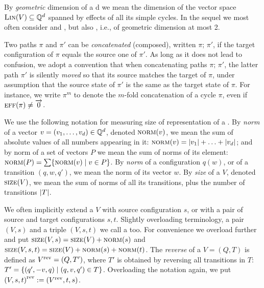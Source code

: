 By  \emph{geometric} dimension of a \parvass d we mean the dimension of the vector
space $\textsc{Lin}(V) \subseteq \mathbb{Q}^d$ spanned by effects of all its simple cycles.
%
In the sequel we most often consider \dvass and \tvass, but also \emph{\geomvass}, i.e.,
\tvass of geometric dimension at most 2.

Two paths $\pi$ and $\pi'$ can be \emph{concatenated} (composed), written $\pi; \, \pi'$, if
the target configuration of $\pi$ equals the source one of $\pi'$.
As long as it does not lead to confusion, 
we adopt a convention that when concatenating paths $\pi;\,\pi'$, 
the latter path $\pi'$ is silently \emph{moved}
so that its source matches the target of $\pi$, 
under assumption that the source state of $\pi'$ is the same as the target state of $\pi$.
For instance, we write $\pi^m$ to denote the $m$-fold concatenation of a cycle $\pi$, even if $\textsc{eff}(\pi)\neq\overrightarrow{0}$.
%

We use the following notation for measuring size of representation of a \vass.
By \emph{norm} of a vector $v=(v_1, \ldots, v_d) \in \mathbb{Q}^d$, denoted $\textsc{norm}(v)$, 
we mean the sum of absolute values of all numbers appearing in it:
$\textsc{norm}(v) = |v_1| + \ldots + |v_d|$; and 
by norm of a set of vectors $P$ we mean the sum of norms of its element:
$\textsc{norm}(P) = \sum\{\textsc{norm}(v) \mid v\in P\}$. 
By \emph{norm} of a configuration $q(w)$, or of a transition $(q, w, q')$,
we mean the norm of its vector $w$.
By \emph{size} of a \vass $V$, denoted $\textsc{size}(V)$, we mean
the sum of norms of all its transitions, 
plus the number of transitions $\left|T\right|$.

We often implicitly extend a \vass $V$ with source configuration $s$, or with
a pair of source and target configurations $s, t$.
Slightly overloading terminology, a pair $(V, s)$ and a triple $(V, s, t)$ we call a \vass too.
For convenience we overload further and put $\textsc{size}(V,s) = \textsc{size}(V) + \textsc{norm}(s)$ and 
$\textsc{size}(V, s, t) = \textsc{size}(V) + \textsc{norm}(s) + \textsc{norm}(t)$.
The \emph{reverse} of a \vass $V = (Q, T)$ is defined as ${V}^{\text{rev}} = (Q, T')$,
where $T'$ is obtained by reversing all transitions in $T$:
$T' = \{(q', -v, q) \mid (q,v,q')\in T\}$.
Overloading the notation again, we put ${(V, s, t)}^{\text{rev}} := ({V}^{\text{rev}}, t, s)$.


